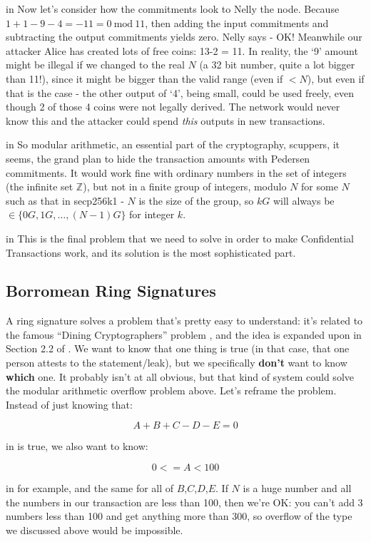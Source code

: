 \documentclass[10pt,a4paper]{article}
\begin{document}
 in \noindent Now let's consider how the commitments look to Nelly the node. Because $1 + 1 -9 - 4 = -11 = 0 \ \textrm{mod} \ 11$, then adding the input commitments and subtracting the output commitments yields zero. Nelly says - OK! Meanwhile our attacker Alice has created lots of free coins: 13-2 = 11. In reality, the `9' amount might be illegal if we changed to the real $N$ (a 32 bit number, quite a lot bigger than 11!), since it might be bigger than the valid range (even if $< N$), but even if that is the case - the other output of `4', being small, could be used freely, even though 2 of those 4 coins were not legally derived. The network would never know this and the attacker could spend \textit{this} outputs in new transactions.

 in \noindent So modular arithmetic, an essential part of the cryptography, scuppers, it seems, the grand plan to hide the transaction amounts with Pedersen commitments. It would work fine with ordinary numbers in the set of integers (the infinite set $\mathbb{Z}$), but not in a finite group of integers, modulo $N$ for some $N$ such as that in secp256k1 - $N$ is the size of the group, so $kG$ will always be $\in \{0G, 1G, \ldots ,(N-1)G\}$ for integer $k$.

 in \noindent This is the final problem that we need to solve in order to make Confidential Transactions work, and its solution is the most sophisticated part.

\subsection{Borromean Ring Signatures}

A ring signature solves a problem that's pretty easy to understand: it's related to the famous ``Dining Cryptographers'' problem \cite{chaum_dc}, and the idea is expanded upon in Section 2.2 of \cite{ms_ringsig}. We want to know that one thing is true (in that case, that one person attests to the statement/leak), but we specifically \textbf{don't} want to know \textbf{which} one. It probably isn't at all obvious, but that kind of system could solve the modular arithmetic overflow problem above. Let's reframe the problem. Instead of just knowing that:

\[A + B + C - D -E = 0\]

 in \noindent is true, we also want to know:

\[0 <= A < 100\]

 in \noindent for example, and the same for all of $B$,$C$,$D$,$E$. If $N$ is a huge number and all the numbers in our transaction are less than 100, then we're OK: you can't add 3 numbers less than 100 and get anything more than 300, so overflow of the type we discussed above would be impossible.
\end{document}
